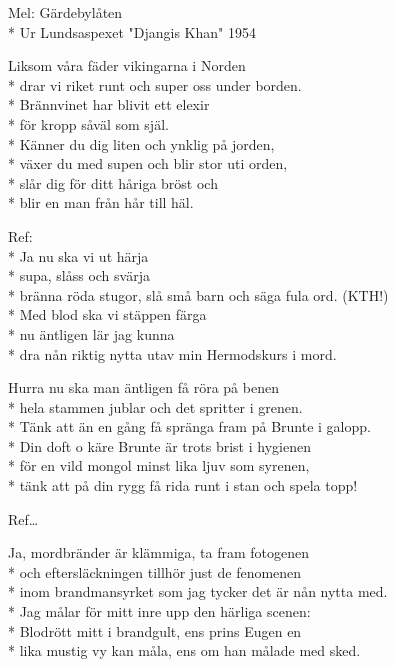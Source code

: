 \begin{SongText}[Härjarvisan]
    \begin{SongInfo}
        Mel: Gärdebylåten\\*%
        Ur Lundsaspexet "Djangis Khan" 1954
    \end{SongInfo}
    \begin{SongVerse}
        Liksom våra fäder vikingarna i Norden\\*%
        drar vi riket runt och super oss under borden.\\*%
        Brännvinet har blivit ett elexir\\*%
        för kropp såväl som själ.\\*%
        Känner du dig liten och ynklig på jorden,\\*%
        växer du med supen och blir stor uti orden,\\*%
        slår dig för ditt håriga bröst och\\*%
        blir en man från hår till häl.
    \end{SongVerse}
    \begin{SongVerse}
        Ref:\\*%
        Ja nu ska vi ut härja\\*%
        supa, slåss och svärja\\*%
        bränna röda stugor, slå små barn och säga fula ord. (KTH!)\\*%
        Med blod ska vi stäppen färga\\*%
        nu äntligen lär jag kunna\\*%
        dra nån riktig nytta utav min Hermodskurs i mord.
    \end{SongVerse}
    \begin{SongVerse}
        Hurra nu ska man äntligen få röra på benen\\*%
        hela stammen jublar och det spritter i grenen.\\*%
        Tänk att än en gång få spränga fram på Brunte i galopp.\\*%
        Din doft o käre Brunte är trots brist i hygienen\\*%
        för en vild mongol minst lika ljuv som syrenen,\\*%
        tänk att på din rygg få rida runt i stan och spela topp!
    \end{SongVerse}
    \begin{SongVerse}
        Ref…
    \end{SongVerse}
    \begin{SongVerse}
        Ja, mordbränder är klämmiga, ta fram fotogenen\\*%
        och eftersläckningen tillhör just de fenomenen\\*%
        inom brandmansyrket som jag tycker det är nån nytta med.\\*%
        Jag målar för mitt inre upp den härliga scenen:\\*%
        Blodrött mitt i brandgult, ens prins Eugen en\\*%
        lika mustig vy kan måla, ens om han målade med sked.
    \end{SongVerse}
\end{SongText}
